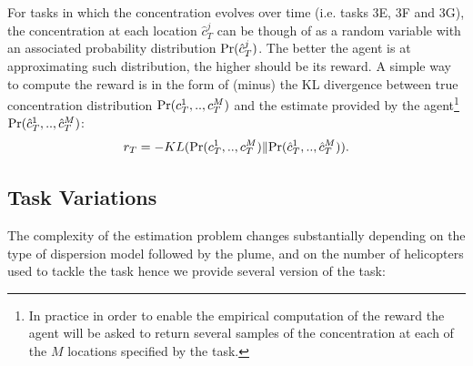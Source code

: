 \documentclass[a4paper,11pt]{report}
\newcommand{\pr}{{\rm Pr}}
\begin{document}
For tasks in which the concentration evolves over time (i.e. tasks 3E, 3F and 3G), the concentration at each location $\hat c^j_T$ can be though of as a random variable with an associated probability distribution $\pr(\hat c^j_T)$.
The better the agent is at approximating such distribution, the higher should be its reward.
A simple way to compute the reward is in the form of (minus) the KL divergence between true concentration distribution $\pr(c^1_T,..,c^M_T)$ and the estimate provided by the agent\footnote{In practice in order to enable the empirical computation of the reward the agent will be asked to return several samples of the concentration at each of the $M$ locations specified by the task.} $\pr(\hat c^1_T,..,\hat c^M_T)$:
$$
r_T = - KL(\pr(c^1_T,..,c^M_T) \|\pr(\hat c^1_T,..,\hat c^M_T)).
$$


\subsection{Task Variations}  \label{PlumeVariations}
The complexity of the estimation problem changes substantially depending on the type of dispersion model followed by the plume, and on the number of helicopters used to tackle the task hence we provide several version of the task:
\end{document}

